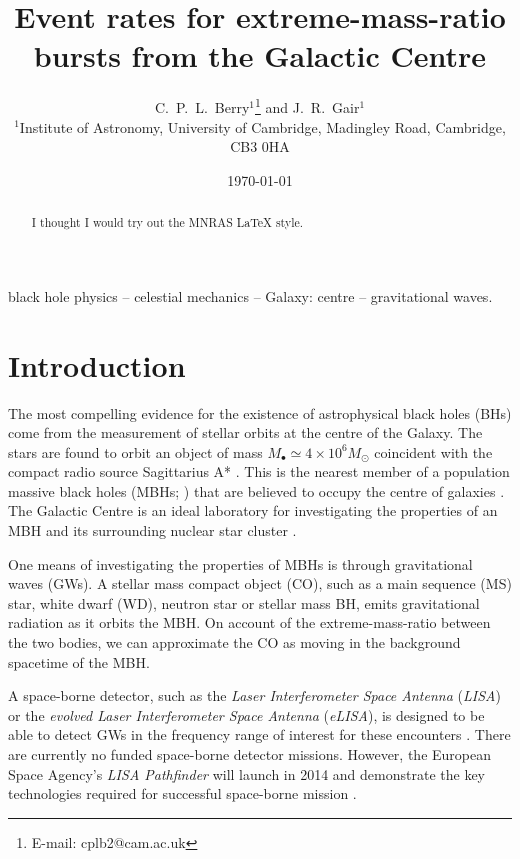 \documentclass[useAMS,usedcolumn,usegraphicx,usenatbib]{mn2e}
\title[Event rates for EMRBs from the GC]{Event rates for extreme-mass-ratio bursts from the Galactic Centre}
\author[C.\ P.\ L.\ Berry and J.\ R.\ Gair]{C.\ P.\ L.\ Berry$^{1}$\thanks{E-mail:
cplb2@cam.ac.uk}  and J.\ R.\ Gair$^{1}$\\
$^{1}$Institute of Astronomy, University of Cambridge, Madingley Road, Cambridge, CB3 0HA}
\begin{document}
\date{\today}

\pagerange{\pageref{firstpage}--\pageref{lastpage}} 

\maketitle

\label{firstpage}

\begin{abstract}
I thought I would try out the MNRAS \LaTeX{} style.
\end{abstract}

\begin{keywords}
black hole physics -- celestial mechanics -- Galaxy: centre -- gravitational waves.
\end{keywords}

\section{Introduction}

The most compelling evidence for the existence of astrophysical black holes (BHs) come from the measurement of stellar orbits at the centre of the Galaxy. The stars are found to orbit an object of mass $M_\bullet \simeq 4 \times 10^6 M_\odot$ coincident with the compact radio source Sagittarius A* \citep{Reid2004, Ghez2008, Gillessen2009}. This is the nearest member of a population massive black holes (MBHs; \citealt{Volonteri2010}) that are believed to occupy the centre of galaxies \citep{Lynden-Bell1969, Lynden-Bell1971, Rees1984, Ferrarese2005}. The Galactic Centre is an ideal laboratory for investigating the properties of an MBH and its surrounding nuclear star cluster \citep{Genzel2010}.

One means of investigating the properties of MBHs is through gravitational waves (GWs). A stellar mass compact object (CO), such as a main sequence (MS) star, white dwarf (WD), neutron star or stellar mass BH, emits gravitational radiation as it orbits the MBH. On account of the extreme-mass-ratio between the two bodies, we can approximate the CO as moving in the background spacetime of the MBH.

A space-borne detector, such as the \textit{Laser Interferometer Space Antenna} (\textit{LISA}) or the \textit{evolved Laser Interferometer Space Antenna} (\textit{eLISA}), is designed to be able to detect GWs in the frequency range of interest for these encounters \citep{Bender1998, Danzmann2003, Jennrich2011, Amaro-Seoane2012a}. There are currently no funded space-borne detector missions. However, the European Space Agency's \textit{LISA Pathfinder} will launch in 2014 and demonstrate the key technologies required for successful space-borne mission \citep{Anza2005, Antonucci2012}.
\end{document}
